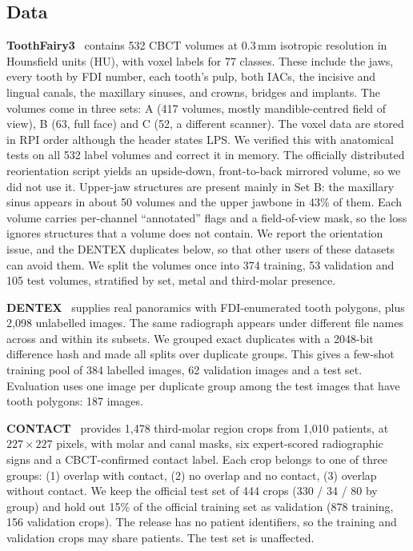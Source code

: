 \documentclass[preprint,12pt]{elsarticle}
\begin{document}
\subsection{Data}
\textbf{ToothFairy3}~\cite{toothfairy3} contains 532 CBCT volumes at 0.3\,mm isotropic resolution in Hounsfield units
(HU), with voxel labels for 77 classes. These include the jaws, every tooth by FDI number, each tooth's pulp, both IACs,
the incisive and lingual canals, the maxillary sinuses, and crowns, bridges and implants. The volumes come in three
sets: A (417 volumes, mostly mandible-centred field of view), B (63, full face) and C (52, a different scanner). The
voxel data are stored in RPI order although the header states LPS. We verified this with anatomical tests on all 532
label volumes and correct it in memory. The officially distributed reorientation script yields an upside-down,
front-to-back mirrored volume, so we did not use it. Upper-jaw structures are present mainly in Set B: the maxillary
sinus appears in about 50 volumes and the upper jawbone in 43\% of them. Each volume carries per-channel ``annotated''
flags and a field-of-view mask, so the loss ignores structures that a volume does not contain. We report the
orientation issue, and the DENTEX duplicates below, so that other users of these datasets can avoid them. We split the volumes once
into 374 training, 53 validation and 105 test volumes, stratified by set, metal and third-molar presence.

\textbf{DENTEX}~\cite{hamamci2023} supplies real panoramics with FDI-enumerated tooth polygons, plus 2,098 unlabelled
images. The same radiograph appears under different file names across and within its subsets. We grouped exact
duplicates with a 2048-bit difference hash and made all splits over duplicate groups. This gives a few-shot training pool
of 384 labelled images, 62 validation images and a test set. Evaluation uses one image per duplicate group among the test
images that have tooth polygons: 187 images.

\textbf{CONTACT}~\cite{ulusoy2025} provides 1,478 third-molar region crops from 1,010 patients, at $227\times227$
pixels, with molar and canal masks, six expert-scored radiographic signs and a CBCT-confirmed contact label. Each crop
belongs to one of three groups: (1) overlap with contact, (2) no overlap and no contact, (3) overlap without contact. We
keep the official test set of 444 crops (330 / 34 / 80 by group) and hold out 15\% of the official training set as
validation (878 training, 156 validation crops). The release has no patient identifiers, so the training and validation
crops may share patients. The test set is unaffected.
\end{document}
